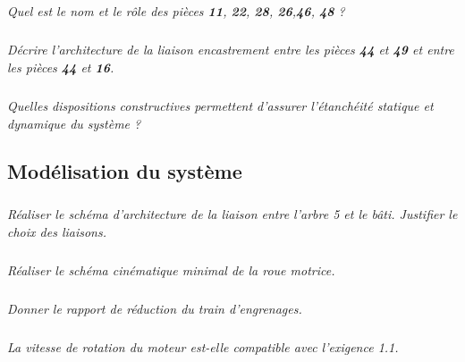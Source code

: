 \documentclass[10pt]{article}
\begin{document}
\subparagraph{}
\textit{Quel est le nom et le rôle des pièces \textbf{11}, \textbf{22}, \textbf{28}, \textbf{26},\textbf{46}, \textbf{48} ?}

\subparagraph{}
\textit{Décrire l'architecture de la liaison encastrement entre les pièces \textbf{44} et \textbf{49} et entre les pièces \textbf{44} et \textbf{16}.}

\subparagraph{}
\textit{Quelles dispositions constructives permettent d'assurer l'étanchéité statique et dynamique du système ?}
\subsection*{Modélisation du système}

\subparagraph{}
\textit{Réaliser le schéma d'architecture de la liaison entre l'arbre 5 et le bâti. Justifier le choix des liaisons.}

\subparagraph{}
\textit{Réaliser le schéma cinématique minimal de la roue motrice.}

\subparagraph{}
\textit{Donner le rapport de réduction du train d'engrenages.}

\subparagraph{}
\textit{La vitesse de rotation du moteur est-elle compatible avec l'exigence 1.1.}
\end{document}
